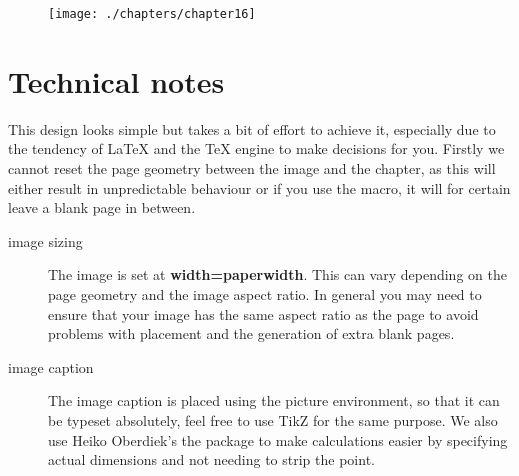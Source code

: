 \medskip

\begin{figure}[ht]
\centering
\texttt{[image: ./chapters/chapter16]}
\end{figure}
\lipsum[2]


\section{Technical notes}

This design looks simple but takes a bit of effort to achieve it, especially due to the tendency of LaTeX and the TeX engine to make decisions for you. Firstly we cannot reset the page geometry between the image and the chapter, as this will either result in unpredictable behaviour or if you use the  macro, it will for certain leave a blank page in between.

\begin{description}
\item [image sizing] The image is set at \textbf{width=paperwidth}. This can vary depending on the page geometry and the image aspect ratio. In general you may need to ensure that your image has the same aspect ratio as the page to avoid problems with placement and the generation of extra blank pages.
\item [image caption] The image caption is placed using the picture environment, so that it can be typeset absolutely, feel free to use TikZ for the same purpose. We also use Heiko Oberdiek's the  package to make calculations easier by specifying actual dimensions and not needing to strip the point.
\end{description}



\restoregeometry

